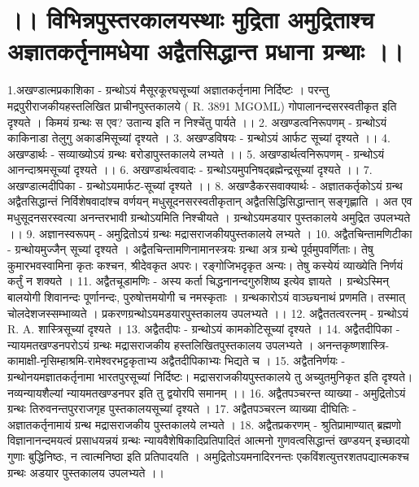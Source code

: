 \chapter{।। विभिन्नपुस्तरकालयस्थाः मुद्रिता अमुद्रिताश्च अज्ञातकर्तृनामधेया अद्वैतसिद्धान्त प्रधाना ग्रन्थाः ।।}
1.अखण्डात्मप्रकाशिका - 
ग्रन्थोऽयं मैसूरकूरघसूच्यां अज्ञातकर्तृनामा निर्दिष्टः । परन्तु मद्रपुरीराजकीयहस्तलिखित प्राचीनपुस्तकालये ( R. 3891 MGOML) गोपालानन्दसरस्वतीकृत इति दृश्यते । किमयं ग्रन्थः स एव? उतान्य इति न निश्चेंतु पार्यते ।।
2. अखण्डत्वनिरूपणम् - 
	ग्रन्थोऽयं काकिनाडा तेलुगु अकाडमिसूच्यां दृश्यते ।
3. अखण्डविषयः - ग्रन्थोऽयं आर्फट सूच्यां दृश्यते ।।
4. अखण्डार्थः - सव्याख्योऽयं ग्रन्थः बरोडापुस्तकालये लभ्यते ।। 
5. अखण्डार्थत्वनिरूपणम् - ग्रन्थोऽयं आनन्दाश्रमसूच्यां दृश्यते ।।
6. अखण्डार्थत्ववादः - ग्रन्थोऽयमुपनिषद्ब्रह्मेन्द्रसूच्यां दृश्यते ।।
7. अखण्डात्मदीपिका - ग्रन्थोऽयमार्फट-सूच्यां दृश्यते ।।
8. अखण्डैकरसवाक्यार्थः -
	अज्ञातकर्तृकोऽयं ग्रन्थ अद्वैतसिद्धान्तं निर्विशेषवादांश्च वर्णयन् मधुसूदनसरस्वतीकृतान् अद्वैतसिद्धिसिद्धान्तान् सङ्गृह्णाति । अत एव मधुसूदनसरस्वत्या अनन्तरभावी ग्रन्थोऽयमिति निश्चीयते । ग्रन्थोऽयमडयार पुस्तकालये अमुद्रित उपलभ्यते ।। 
9. अज्ञानस्वरूपम् - अमुद्रितोऽयं ग्रन्थः मद्रासराजकीयपुस्तकालये लभ्यते ।
10. अद्वैतचिन्तामणिटीका -
	ग्रन्थोयमुज्जैन् सूच्यां दृश्यते । अद्वैतचिन्तामणिनामानस्त्रयः ग्रन्था अत्र ग्रन्थे पूर्वमुपवर्णिताः। तेषु कुमारभवस्वामिना कृतः कश्चन, श्रीदेवकृत अपरः। रङ्गोजिभदृकृत अन्यः। तेषु कस्येयं व्याख्येति निर्णयं कर्तुं न शक्यते । 
11. अद्वैतचूडामणिः - 
	अस्य कर्ता चिद्धनानन्दगुरुशिष्य इत्येव ज्ञायते । ग्रन्थेऽस्मिन् बालयोगी शिवानन्दः पूर्णानन्दः, पुरुषोत्तमयोगी च नमस्कृताः । ग्रन्थकारोऽयं वाञ्छ्यनाथं प्रणमति। तस्मात् चोलदेशजस्सम्भाव्यते । प्रकरणग्रन्थोऽयमडयारपुस्तकालय उपलभ्यते ।। 
12. अद्वैततत्वरत्नम् - ग्रन्थोऽयं R. A. शास्त्रिसूच्यां दृश्यते । 
13. अद्वैतदीपः - ग्रन्थोऽयं कामकोटिसूच्यां दृश्यते ।
14. अद्वैतदीपिका - 
	न्यायमतखण्डनपरोऽयं ग्रन्थः मद्रासराजकीय हस्तलिखितपुस्तकालय उपलभ्यते । अनन्तकृष्णशास्त्रि-कामाक्षी-नृसिम्हाश्रमि-रामेश्वरभट्टकृताभ्य अद्वैतदीपिकाभ्यः भिद्यते च । 
15. अद्वैतनिर्णयः - 
	ग्रन्थोनयमज्ञातकर्तृनामा भारतपुरसूच्यां निर्दिष्टः। मद्रासराजकीयपुस्तकालये तु अच्युतमुनिकृत इति दृश्यते। नव्यन्यायशैल्यां न्यायमतखण्डनपर इति तु द्वयोरपि समानम् ।।
16. अद्वैतपञ्चरन्त व्याख्या -
	अमुद्रितोऽयं ग्रन्थः तिरुवनन्तपुरराजगृह पुस्तकालयसूच्यां दृश्यते । 
17. अद्वैतपञ्चरत्न व्याख्या दीघितिः -
	अज्ञातकर्तृनामायं ग्रन्थ मद्रासराजकीय पुस्तकालये लभ्यते । 
18. अद्वैतप्रकरणम् -
	श्रुतिप्रामाण्यात् ब्रह्मणो विज्ञानानन्दमयत्वं प्रसाधयन्नयं ग्रन्थः न्यायवैशेषिकादिप्रतिपादितं आत्मनो गुणवत्वसिद्धान्तं खण्डयन् इच्छादयो गुणाः बुद्धिनिष्ठः, न त्वात्मनिष्ठा इति प्रतिपादयति । अमुद्रितोऽयमनादिरनन्तः एकविंशत्युत्तरशतपद्यात्मकश्च ग्रन्थः अडयार पुस्तकालय उपलभ्यते ।। 
